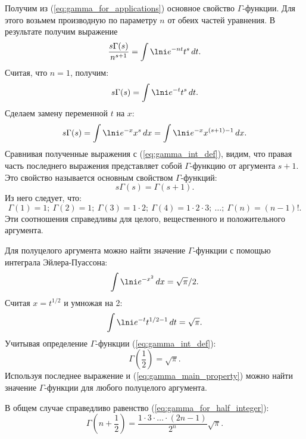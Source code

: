Получим из (\ref{eq:gamma_for_applications})  основное свойство
\( \Gamma \)-функции. Для этого возьмем производную по параметру \( n \) от
обеих частей уравнения. В результате получим выражение
\[
    \frac{s\Gamma(s)}{n^{s+1}} = \int\lni e^{-nt}t^s\,dt.
\]
Считая, что \( n = 1 \), получим:
\[
    s\Gamma(s) = \int\lni e^{-t}t^s\,dt.
\]
Сделаем замену переменной \( t \) на \( x \):
\[
    s\Gamma(s) = \int\lni e^{-x}x^s\,dx = \int\lni e^{-x}x^{(s+1)-1}\,dx.
\]
Сравнивая полученные выражения с (\ref{eq:gamma_int_def}), видим, что правая
часть последнего выражения представляет собой \( \Gamma \)-функцию от аргумента
\( s + 1 \). Это свойство называется основным свойством \( \Gamma \)-функций:
\begin{equation}
    s\Gamma(s) = \Gamma(s+1).
    \label{eq:gamma_main_property}
\end{equation}
Из него следует, что:
\[
    \Gamma(1) = 1;\ \Gamma(2) = 1;\ \Gamma(3) = 1\cdot2; \ 
    \Gamma(4) = 1\cdot2\cdot3;\ \ldots;\ \Gamma(n) = (n - 1)!.
\]
Эти соотношения справедливы для целого, вещественного и положительного аргумента.

Для полуцелого аргумента можно найти значение \( \Gamma \)-функции с помощью
интеграла Эйлера-Пуассона:
\[
    \int\lni e^{-x^2}\,dx = \sqrt{\pi}/2.
\]
Считая \( x = t^{1/2} \) и умножая на 2:
\[
    \int\lni e^{-t}t^{1/2-1}\,dt = \sqrt{\pi}.
\]
Учитывая определение \( \Gamma \)-функции (\ref{eq:gamma_int_def}):
\[
    \Gamma\left(\frac{1}{2}\right) = \sqrt{\pi}.
\]
Используя последнее выражение и (\ref{eq:gamma_main_property}) можно найти
значение \( \Gamma \)-функции для любого полуцелого аргумента.

В общем случае справедливо равенство (\ref{eq:gamma_for_half_integer}):
\begin{equation}
    \Gamma\left(n + \frac{1}{2}\right) =
    \frac{1\cdot3\cdot\ldots\cdot(2n - 1)}{2^n}\sqrt{\pi}.
    \label{eq:gamma_for_half_integer}
\end{equation}

